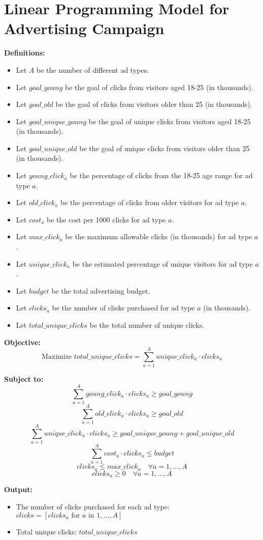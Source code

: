\documentclass{article}
\begin{document}
\section*{Linear Programming Model for Advertising Campaign}

\textbf{Definitions:}
\begin{itemize}
    \item Let \( A \) be the number of different ad types.
    \item Let \( goal\_young \) be the goal of clicks from visitors aged 18-25 (in thousands).
    \item Let \( goal\_old \) be the goal of clicks from visitors older than 25 (in thousands).
    \item Let \( goal\_unique\_young \) be the goal of unique clicks from visitors aged 18-25 (in thousands).
    \item Let \( goal\_unique\_old \) be the goal of unique clicks from visitors older than 25 (in thousands).
    \item Let \( young\_click_a \) be the percentage of clicks from the 18-25 age range for ad type \( a \).
    \item Let \( old\_click_a \) be the percentage of clicks from older visitors for ad type \( a \).
    \item Let \( cost_a \) be the cost per 1000 clicks for ad type \( a \).
    \item Let \( max\_click_a \) be the maximum allowable clicks (in thousands) for ad type \( a \).
    \item Let \( unique\_click_a \) be the estimated percentage of unique visitors for ad type \( a \).
    \item Let \( budget \) be the total advertising budget.
    \item Let \( clicks_a \) be the number of clicks purchased for ad type \( a \) (in thousands).
    \item Let \( total\_unique\_clicks \) be the total number of unique clicks.
\end{itemize}

\textbf{Objective:}
\[
\text{Maximize } total\_unique\_clicks = \sum_{a=1}^{A} unique\_click_a \cdot clicks_a
\]

\textbf{Subject to:}
\[
\sum_{a=1}^{A} young\_click_a \cdot clicks_a \geq goal\_young
\]
\[
\sum_{a=1}^{A} old\_click_a \cdot clicks_a \geq goal\_old
\]
\[
\sum_{a=1}^{A} unique\_click_a \cdot clicks_a \geq goal\_unique\_young + goal\_unique\_old
\]
\[
\sum_{a=1}^{A} cost_a \cdot clicks_a \leq budget
\]
\[
clicks_a \leq max\_click_a \quad \forall a = 1, \ldots, A
\]
\[
clicks_a \geq 0 \quad \forall a = 1, \ldots, A
\]

\textbf{Output:}
\begin{itemize}
    \item The number of clicks purchased for each ad type: \( clicks = [clicks_a \text{ for } a \text{ in } 1, \ldots, A] \)
    \item Total unique clicks: \( total\_unique\_clicks \)
\end{itemize}
\end{document}
